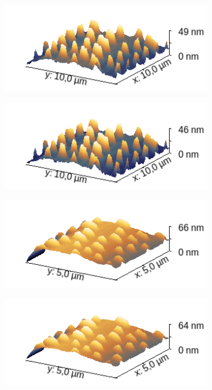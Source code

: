\begin{figure}[H]
    \centering
    \begin{subfigure}{0.49\textwidth}
        \includegraphics[width=\textwidth]{bilder/CD,DVD,Blu-Ray/CD_s.png}
        \caption{}
    \end{subfigure}
    \begin{subfigure}{0.49\textwidth}
        \includegraphics[width=\textwidth]{bilder/CD,DVD,Blu-Ray/CD_Bac_s.png}
        \caption{}
    \end{subfigure}
    \begin{subfigure}{0.49\textwidth}
        \includegraphics[width=\textwidth]{bilder/CD,DVD,Blu-Ray/DVD_s.png}
        \caption{}
    \end{subfigure}
    \begin{subfigure}{0.49\textwidth}
        \includegraphics[width=\textwidth]{bilder/CD,DVD,Blu-Ray/DVD_Bac_s.png}

\end{subfigure}
\end{figure}
